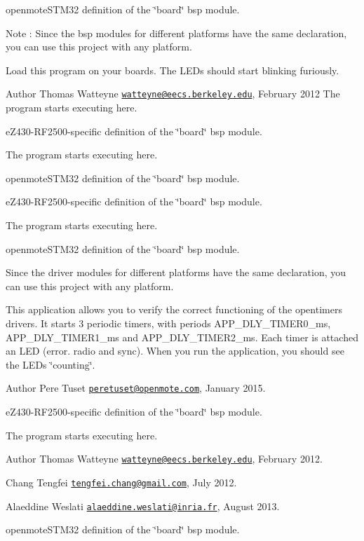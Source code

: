 openmote\+S\+T\+M32 definition of the \char`\"{}board\char`\"{} bsp module.

\begin{DoxyNote}{Note}
\+: Since the bsp modules for different platforms have the same declaration, you can use this project with any platform.
\end{DoxyNote}
Load this program on your boards. The L\+E\+Ds should start blinking furiously.

\begin{DoxyAuthor}{Author}
Thomas Watteyne \href{mailto:watteyne@eecs.berkeley.edu}{\tt watteyne@eecs.\+berkeley.\+edu}, February 2012 The program starts executing here.
\end{DoxyAuthor}
e\+Z430-\/\+R\+F2500-\/specific definition of the \char`\"{}board\char`\"{} bsp module.

The program starts executing here.

openmote\+S\+T\+M32 definition of the \char`\"{}board\char`\"{} bsp module.

e\+Z430-\/\+R\+F2500-\/specific definition of the \char`\"{}board\char`\"{} bsp module.

The program starts executing here.

openmote\+S\+T\+M32 definition of the \char`\"{}board\char`\"{} bsp module.

Since the driver modules for different platforms have the same declaration, you can use this project with any platform.

This application allows you to verify the correct functioning of the opentimers drivers. It starts 3 periodic timers, with periods A\+P\+P\+\_\+\+D\+L\+Y\+\_\+\+T\+I\+M\+E\+R0\+\_\+ms, A\+P\+P\+\_\+\+D\+L\+Y\+\_\+\+T\+I\+M\+E\+R1\+\_\+ms and A\+P\+P\+\_\+\+D\+L\+Y\+\_\+\+T\+I\+M\+E\+R2\+\_\+ms. Each timer is attached an L\+ED (error. radio and sync). When you run the application, you should see the L\+E\+Ds \char`\"{}counting\char`\"{}.

\begin{DoxyAuthor}{Author}
Pere Tuset \href{mailto:peretuset@openmote.com}{\tt peretuset@openmote.\+com}, January 2015.
\end{DoxyAuthor}
e\+Z430-\/\+R\+F2500-\/specific definition of the \char`\"{}board\char`\"{} bsp module.

The program starts executing here.

\begin{DoxyAuthor}{Author}
Thomas Watteyne \href{mailto:watteyne@eecs.berkeley.edu}{\tt watteyne@eecs.\+berkeley.\+edu}, February 2012. 

Chang Tengfei \href{mailto:tengfei.chang@gmail.com}{\tt tengfei.\+chang@gmail.\+com}, July 2012. 

Alaeddine Weslati \href{mailto:alaeddine.weslati@inria.fr}{\tt alaeddine.\+weslati@inria.\+fr}, August 2013.
\end{DoxyAuthor}
openmote\+S\+T\+M32 definition of the \char`\"{}board\char`\"{} bsp module.

